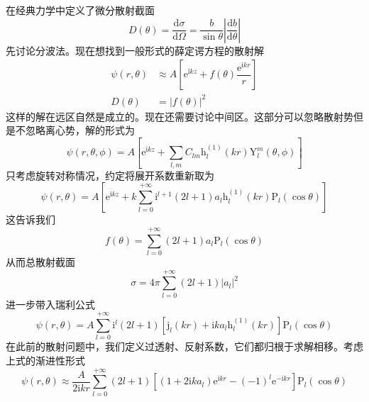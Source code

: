 \documentclass[12pt, a4paper, oneside]{ctexart}
\begin{document}
	\quad\quad 在经典力学中定义了微分散射截面
	\begin{equation}
		D(\theta)=\dfrac{\mathrm{d}\sigma}{\mathrm{d}\Omega}=\dfrac{b}{\sin\theta}\left|\dfrac{\mathrm{d}b}{\mathrm{d}\theta}\right|
	\end{equation}
	\quad\quad 先讨论分波法。现在想找到一般形式的薛定谔方程的散射解
	\begin{align}
		\psi(r,\theta)&\approx A\left[\mathrm{e}^{\mathrm{i}kz}+f(\theta)\dfrac{\mathrm{e}^{\mathrm{i}kr}}{r}\right]\\
		D(\theta)&=\left|f(\theta)\right|^{2}
	\end{align}
	\quad\quad 这样的解在远区自然是成立的。现在还需要讨论中间区。这部分可以忽略散射势但是不忽略离心势，解的形式为
	\begin{equation}
		\psi\left(r,\theta,\phi\right)=A\left[\mathrm{e}^{\mathrm{i}kz}+\sum_{l,m}C_{lm}\mathrm{h}_{l}^{\left(1\right)}\left(kr\right)\mathrm{Y}_{l}^{m}\left(\theta,\phi\right)\right]
	\end{equation}
	\quad\quad 只考虑旋转对称情况，约定将展开系数重新取为
	\begin{equation}
		\psi\left(r,\theta\right)=A\left[\mathrm{e}^{\mathrm{i}kz}+k\sum_{l=0}^{+\infty}\mathrm{i}^{l+1}\left(2l+1\right)a_{l}\mathrm{h}_{l}^{\left(1\right)}\left(kr\right)\mathrm{P}_{l}\left(\cos\theta\right)\right]
	\end{equation}
	\quad\quad 这告诉我们
	\begin{equation}
		f\left(\theta\right)=\sum_{l=0}^{+\infty}\left(2l+1\right)a_{l}\mathrm{P}_{l}\left(\cos\theta\right)
	\end{equation}
	\quad\quad 从而总散射截面
	\begin{equation}
		\sigma=4\pi\sum_{l=0}^{+\infty}\left(2l+1\right)\left|a_{l}\right|^{2}
	\end{equation}
	\quad\quad 进一步带入瑞利公式
    \begin{equation}
    	\psi\left(r,\theta\right)=A\sum_{l=0}^{+\infty}\mathrm{i}^{l}\left(2l+1\right)\left[\mathrm{j}_{l}\left(kr\right)+\mathrm{i}ka_{l}\mathrm{h}_{l}^{\left(1\right)}\left(kr\right)\right]\mathrm{P}_{l}\left(\cos\theta\right)
    \end{equation}
    \quad\quad 在此前的散射问题中，我们定义过透射、反射系数，它们都归根于求解相移。考虑上式的渐进性形式
    \begin{equation}
    	\psi\left(r,\theta\right)\approx\dfrac{A}{2\mathrm{i}kr}\sum_{l=0}^{+\infty}\left(2l+1\right)\left[\left(1+2\mathrm{i}ka_{l}\right)\mathrm{e}^{\mathrm{i}kr}-\left(-1\right)^{l}\mathrm{e}^{-\mathrm{i}kr}\right]\mathrm{P}_{l}\left(\cos\theta\right)
    \end{equation}
\end{document}
